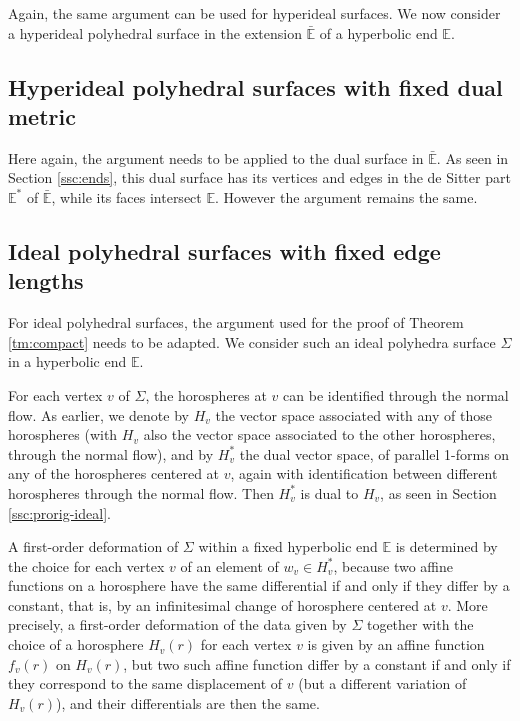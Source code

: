\documentclass[notitlepage,twoside,a4paper]{amsart}
\theoremstyle{named}
\newcommand{\bE}{{\mathbb E}}
\begin{document}
Again, the same argument can be used for hyperideal surfaces. We now consider a hyperideal polyhedral surface in the extension $\bar \bE$ of a hyperbolic end $\bE$. 

\subsection{Hyperideal polyhedral surfaces with fixed dual metric}
\label{ssc:defo-hyperi*}

Here again, the argument needs to be applied to the dual surface in $\bar \bE$. As seen in Section \ref{ssc:ends}, this dual surface has its vertices and edges in the de Sitter part $\bE^*$ of $\bar \bE$, while its faces intersect $\bE$. However the argument remains the same. 

\subsection{Ideal polyhedral surfaces with fixed edge lengths}
\label{ssc:defo-ideal}

For ideal polyhedral surfaces, the argument used for the proof of Theorem \ref{tm:compact} needs to be adapted. We consider such an ideal polyhedra surface $\Sigma$ in a hyperbolic end $\bE$.

For each vertex $v$ of $\Sigma$, the horospheres at $v$ can be identified through the normal flow. As earlier, we denote by $H_v$ the vector space associated with any of those horospheres (with $H_v$ also the vector space associated to the other horospheres, through the normal flow), and by $H_v^*$ the dual vector space, of parallel 1-forms on any of the horospheres centered at $v$, again with identification between different horospheres through the normal flow. Then $H^*_v$ is dual to $H_v$, as seen in Section \ref{ssc:prorig-ideal}.

A first-order deformation of $\Sigma$ within a fixed hyperbolic end $\bE$ is determined by the choice for each vertex $v$ of an element of $w_v\in H^*_v$, because two affine functions on a horosphere have the same differential if and only if they differ by a constant, that is, by an infinitesimal change of horosphere centered at $v$. More precisely, a first-order deformation of the data given by $\Sigma$ together with the choice of a horosphere $H_v(r)$ for each vertex $v$ is given by an affine function $f_v(r)$ on $H_v(r)$, but two such affine function differ by a constant if and only if they correspond to the same displacement of $v$ (but a different variation of $H_v(r)$), and their differentials are then the same.
\end{document}
